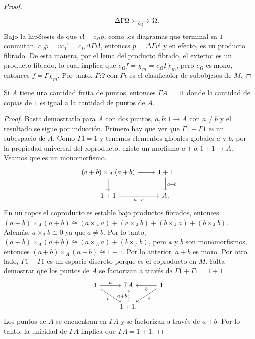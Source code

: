 \begin{proof}
\begin{equation*}
\begin{tikzcd}
      &\Delta\Gamma\Omega\ar[swap,tail]{r}{c_{\Omega}} & \Omega.
    \end{tikzcd}
  \end{equation*}
  Bajo la hipótesis de que $v!=c_{\Omega}p$, como los diagramas que terminal en $1$ conmutan, 
  $c_{\Omega}p=vc_1!=c_{\Omega}\Delta\Gamma v!$, entonces $p=\Delta\Gamma v!$ y en efecto, es un producto fibrado.
  De esta manera, por el lema del producto fibrado, el exterior es un producto fibrado, lo cual implica que
  $c_{\Omega}f=\chi_m=c_{\Omega}\Gamma \chi_m$, pero $c_{\Omega}$ es mono, entonces $f=\Gamma \chi_m$. 
  Por tanto, $\Gamma\Omega$ con $\Gamma v$ es el clasificador de subobjetos de $M$.
\end{proof}

\begin{theorem}[label=thm:puntitos]
  Si $A$ tiene una cantidad finita de puntos, entonces $\Gamma A=\sqcup 1$ donde la cantidad de copias
  de $1$ es igual a la cantidad de puntos de $A$.
\end{theorem}
\begin{proof}
  Basta demostrarlo para $A$ con dos puntos, $a,b\colon 1\to A$ con $a\neq b$ y el resultado se sigue por inducción.
  Primero hay que ver que $\Gamma1 + \Gamma1$ es un subespacio de $A$. Como $\Gamma 1=1$ y tenemos elementos globales 
  globales $a$ y $b$, por la propiedad universal del coproducto, existe un morfismo $a+b\colon 1+1\to A$. Veamos que es un monomorfismo.
  \begin{equation*}
    \begin{tikzcd}
      (a+b)\times_A (a+b)\ar{r}\ar{d} & 1+1\ar{d}{a+b}\\
      1+1\ar[swap]{r}{a+b} & A.
    \end{tikzcd}
  \end{equation*}
  En un topos el coproducto es estable bajo productos fibrados, entonces $(a+b)\times_A (a+b)\cong
  (a\times_A a) + (a\times_A b) + (b\times_A a) + (b\times_A b)$. Además, $a\times_A b\cong 0$
  ya que $a\neq b$. Por lo tanto, $(a+b)\times_A (a+b)\cong (a\times_A a) + (b\times_A b)$, pero $a$ y $b$
  son monomorfismos, entonces $(a+b)\times_A (a+b)\cong 1+1$. Por lo anterior, $a+b$ es mono. Por otro lado,
  $\Gamma1+\Gamma1$ es un espacio discreto porque es el coproducto en $M$. Falta demostrar que los puntos
  de $A$ se factorizan a través de $\Gamma1+\Gamma1 = 1+1$.
  \begin{equation*}
    \begin{tikzcd}
      1\ar{r}{a}\ar[swap]{dr}{i} & \Gamma A & 1\ar{l}{b}\ar{dl}{i} \\
      {} & 1+1.\ar[dashed]{u}{a+b} 
    \end{tikzcd}
  \end{equation*}
  Los puntos de $A$ se encuentran en $\Gamma A$ y se factorizan a través de $a+b$. Por lo tanto,
  la unicidad de $\Gamma A$ implica que $\Gamma A = 1+1$.
\end{proof}


